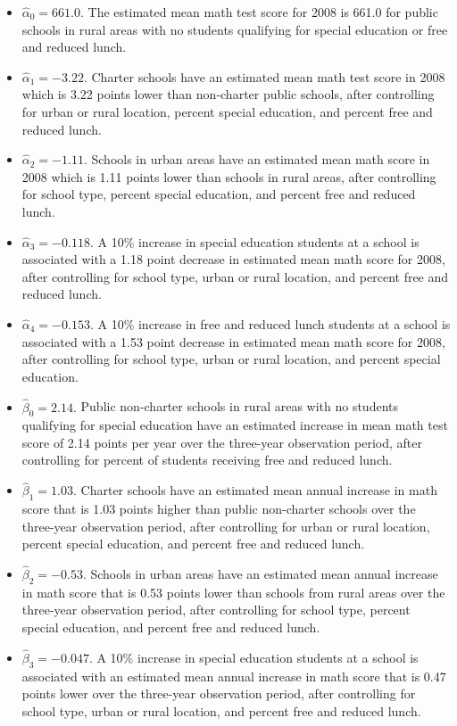 \documentclass[
]{krantz}
\providecommand{\tightlist}{%
  \setlength{\itemsep}{0pt}\setlength{\parskip}{0pt}}
\begin{document}
\begin{itemize}
\tightlist
\item
  \(\hat{\alpha}_{0}= 661.0.\) The estimated mean math test score for 2008 is 661.0 for public schools in rural areas with no students qualifying for special education or free and reduced lunch.
\item
  \(\hat{\alpha}_{1}= -3.22.\) Charter schools have an estimated mean math test score in 2008 which is 3.22 points lower than non-charter public schools, after controlling for urban or rural location, percent special education, and percent free and reduced lunch.
\item
  \(\hat{\alpha}_{2}= -1.11.\) Schools in urban areas have an estimated mean math score in 2008 which is 1.11 points lower than schools in rural areas, after controlling for school type, percent special education, and percent free and reduced lunch.
\item
  \(\hat{\alpha}_{3}= -0.118.\) A 10\% increase in special education students at a school is associated with a 1.18 point decrease in estimated mean math score for 2008, after controlling for school type, urban or rural location, and percent free and reduced lunch.
\item
  \(\hat{\alpha}_{4}= -0.153.\) A 10\% increase in free and reduced lunch students at a school is associated with a 1.53 point decrease in estimated mean math score for 2008, after controlling for school type, urban or rural location, and percent special education.
\item
  \(\hat{\beta}_{0}= 2.14.\) Public non-charter schools in rural areas with no students qualifying for special education have an estimated increase in mean math test score of 2.14 points per year over the three-year observation period, after controlling for percent of students receiving free and reduced lunch.
\item
  \(\hat{\beta}_{1}= 1.03.\) Charter schools have an estimated mean annual increase in math score that is 1.03 points higher than public non-charter schools over the three-year observation period, after controlling for urban or rural location, percent special education, and percent free and reduced lunch.
\item
  \(\hat{\beta}_{2}= -0.53.\) Schools in urban areas have an estimated mean annual increase in math score that is 0.53 points lower than schools from rural areas over the three-year observation period, after controlling for school type, percent special education, and percent free and reduced lunch.
\item
  \(\hat{\beta}_{3}= -0.047.\) A 10\% increase in special education students at a school is associated with an estimated mean annual increase in math score that is 0.47 points lower over the three-year observation period, after controlling for school type, urban or rural location, and percent free and reduced lunch.
\end{itemize}
\end{document}
